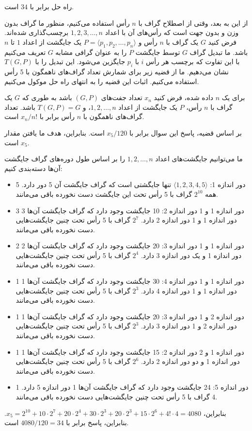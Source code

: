\begin{solution}
راه حل برابر با $34$ است.

از این به بعد، وقتی از اصطلاح گراف با $n$ رأس استفاده می‌کنیم، منظور ما گراف بدون وزن و بدون جهت است که رأس‌های آن با اعداد $1, 2, 3, \ldots, n$ برچسب‌گذاری شده‌اند. فرض کنید $G$ یک گراف با $n$ رأس و $P = \langle p_1, p_2, \ldots, p_n \rangle$ یک جایگشت از اعداد $1$ تا $n$ باشد. ما تبدیل گراف $G$ توسط جایگشت $P$ را به عنوان گرافی مشابه $G$ تعریف می‌کنیم با این تفاوت که برچسب هر رأس $i$ با $p_i$ جایگزین می‌شود. این تبدیل را با $T(G, P)$ نشان می‌دهیم.
ما از قضیه زیر برای شمارش تعداد گراف‌های ناهمگون با 5 رأس استفاده می‌کنیم. اثبات این قضیه را به انتهای راه حل موکول می‌کنیم.
\begin{lemma}\label{قضیه}
برای یک $n$ داده شده، فرض کنید $x_n$ تعداد جفت‌های $(G, P)$ باشد به طوری که $G$ یک گراف با $n$ رأس، $P$ یک جایگشت از اعداد $1,2, \ldots, n$، و $T(G, P) = G$ باشد. تعداد گراف‌های ناهمگون با $n$ رأس برابر با $x_n/n!$ است.
\end{lemma}

بر اساس قضیه، پاسخ این سوال برابر با $x_5 / 120$ است. بنابراین، هدف ما یافتن مقدار $x_5$ است.

ما می‌توانیم جایگشت‌های اعداد $1, 2, \ldots, n$ را بر اساس طول دوره‌های گراف جایگشت آن‌ها دسته‌بندی کنیم:
\begin{itemize}
\item 5 دور اندازه 1: $\langle 1, 2, 3, 4 ,5 \rangle$ تنها جایگشتی است که گراف جایگشت آن 5 دور دارد. همه $2^{10}$ گراف با 5 رأس تحت این جایگشت دست نخورده باقی می‌مانند.
\item 3 دور اندازه 1 و 1 دور اندازه 2: 10 جایگشت وجود دارد که گراف جایگشت آن‌ها 3 دور اندازه 1 و 1 دور اندازه 2 دارد. $2^{7}$ گراف با 5 رأس تحت چنین جایگشت‌هایی دست نخورده باقی می‌مانند.
\item 2 دور اندازه 1 و 1 دور اندازه 3: 20 جایگشت وجود دارد که گراف جایگشت آن‌ها 2 دور اندازه 1 و یک دور اندازه 3 دارد. $2^{4}$ گراف با 5 رأس تحت چنین جایگشت‌هایی دست نخورده باقی می‌مانند.
\item 1 دور اندازه 1 و 1 دور اندازه 4: 30 جایگشت وجود دارد که گراف جایگشت آن‌ها 1 دور اندازه 1 و 1 دور اندازه 4 دارد. $2^{3}$ گراف با 5 رأس تحت چنین جایگشت‌هایی دست نخورده باقی می‌مانند.
\item 1 دور اندازه 2 و 1 دور اندازه 3: 20 جایگشت وجود دارد که گراف جایگشت آن‌ها 1 دور اندازه 2 و 1 دور اندازه 3 دارد. $2^{3}$ گراف با 5 رأس تحت چنین جایگشت‌هایی دست نخورده باقی می‌مانند.
\item 1 دور اندازه 1 و 2 دور اندازه 2: 15 جایگشت وجود دارد که گراف جایگشت آن‌ها 1 دور اندازه 1 و دو دور اندازه 2 دارد. $2^{6}$ گراف با 5 رأس تحت چنین جایگشت‌هایی دست نخورده باقی می‌مانند.
\item 1 دور اندازه 5: 24 جایگشت وجود دارد که گراف جایگشت آن‌ها 1 دور اندازه 5 دارد. 4 گراف با 5 رأس تحت چنین جایگشت‌هایی دست نخورده باقی می‌مانند.
\end{itemize}
بنابراین، $x_5 = 2^{10} + 10\cdot 2^7 + 20\cdot 2^4 + 30\cdot 2^3 + 20\cdot 2^3 + 15\cdot 2^6 + 4!\cdot 4 = 4080$. بنابراین، پاسخ برابر با $4080/120 = 34$ است.


\end{solution}
